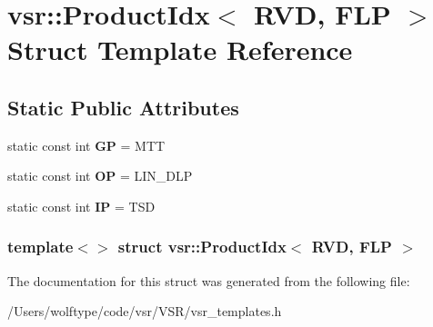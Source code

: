 \hypertarget{structvsr_1_1_product_idx_3_01_r_v_d_00_01_f_l_p_01_4}{\section{vsr\-:\-:Product\-Idx$<$ R\-V\-D, F\-L\-P $>$ Struct Template Reference}
\label{structvsr_1_1_product_idx_3_01_r_v_d_00_01_f_l_p_01_4}
}
\subsection*{Static Public Attributes}
\begin{DoxyCompactItemize}
\item 
\hypertarget{structvsr_1_1_product_idx_3_01_r_v_d_00_01_f_l_p_01_4_af7badb30013cdb0cea475b85ed7807ce}{static const int {\bfseries G\-P} = M\-T\-T}\label{structvsr_1_1_product_idx_3_01_r_v_d_00_01_f_l_p_01_4_af7badb30013cdb0cea475b85ed7807ce}

\item 
\hypertarget{structvsr_1_1_product_idx_3_01_r_v_d_00_01_f_l_p_01_4_a92950446ce13e67229d0bc4976411dd4}{static const int {\bfseries O\-P} = L\-I\-N\-\_\-\-D\-L\-P}\label{structvsr_1_1_product_idx_3_01_r_v_d_00_01_f_l_p_01_4_a92950446ce13e67229d0bc4976411dd4}

\item 
\hypertarget{structvsr_1_1_product_idx_3_01_r_v_d_00_01_f_l_p_01_4_a2552d33907157fe36d29b81a4c73ab8e}{static const int {\bfseries I\-P} = T\-S\-D}\label{structvsr_1_1_product_idx_3_01_r_v_d_00_01_f_l_p_01_4_a2552d33907157fe36d29b81a4c73ab8e}

\end{DoxyCompactItemize}
\subsubsection*{template$<$$>$ struct vsr\-::\-Product\-Idx$<$ R\-V\-D, F\-L\-P $>$}



The documentation for this struct was generated from the following file\-:\begin{DoxyCompactItemize}
\item 
/\-Users/wolftype/code/vsr/\-V\-S\-R/vsr\-\_\-templates.\-h\end{DoxyCompactItemize}
